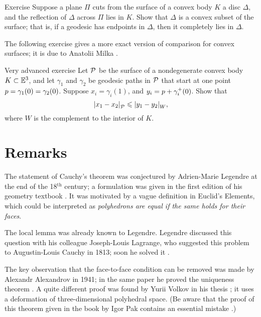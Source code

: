 \begin{thm}{Exercise}\label{ex:convex}
Suppose a plane $\Pi$ cuts from the surface of a convex body $K$ a disc $\Delta$, and the reflection of $\Delta$ across $\Pi$ lies in $K$.
Show that $\Delta$ is a convex subset of the surface;
that is, if a geodesic has endpoints in $\Delta$, then it completely lies in $\Delta$.
\end{thm}

The following exercise gives a more exact version of comparison for convex surfaces;
it is due to Anatolii Milka \cite[Theorem 2]{milka1982}.

\begin{thm}{Very advanced exercise}\label{ex:milka}
Let $\mathcal{P}$ be the surface of a nondegenerate convex body $K\subset\mathbb{E}^3$,
and let $\gamma_1$ and $\gamma_2$ be geodesic paths in $\mathcal{P}$ that start at one point $p=\gamma_1(0)=\gamma_2(0)$.
Suppose $x_i=\gamma_i(1)$, and $y_i=p+\gamma_i^+(0)$.
Show that
\[|{x_1}-{x_2}|_{\mathcal{P}}^{{}}\leqslant |{y_1}-{y_2}|_{W}^{{}},\]
where $W$ is the complement to the interior of $K$.

\end{thm}



\section{Remarks}


The statement of Cauchy's theorem was conjectured by Adrien-Marie Legendre at the end of the 18$^\text{th}$ century;
a formulation was given in the first edition of his geometry textbook \cite{legendre}.
It was motivated by a vague definition in Euclid's Elements, which could be interpreted as
\textit{polyhedrons are equal if the same holds for their faces}.

The local lemma was already known to Legendre.
Legendre discussed this question with his colleague Joseph-Louis Lagrange, who suggested this problem to Augustin-Louis Cauchy in 1813; soon he solved it \cite{cauchy}.

The key observation that the face-to-face condition can be removed was made by
Alexandr Alexandrov in 1941; in the same paper he proved the uniqueness theorem \cite{alexandrov-1941}.
A quite different proof was found by Yurii Volkov in his thesis \cite{volkov}; it uses a deformation of three-dimensional polyhedral space.
(Be aware that the proof of this theorem given in the book by Igor Pak contains an essential mistake \cite{petrunin-2023}.)


